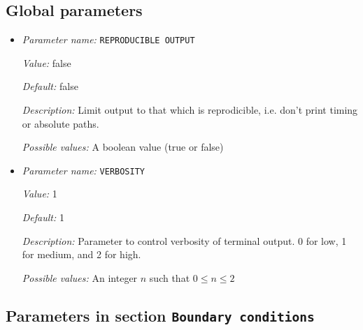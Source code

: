 \subsection{Global parameters}
\label{parameters:global}


\begin{itemize}
\item {\it Parameter name:} {\tt REPRODUCIBLE OUTPUT}
\label{parameters:REPRODUCIBLE OUTPUT}
\label{parameters:REPRODUCIBLE_20OUTPUT}


{\it Value:} false


{\it Default:} false


{\it Description:} Limit output to that which is reprodicible, i.e. don't print timing or absolute paths.


{\it Possible values:} A boolean value (true or false)
\item {\it Parameter name:} {\tt VERBOSITY}
\label{parameters:VERBOSITY}


{\it Value:} 1


{\it Default:} 1


{\it Description:} Parameter to control verbosity of terminal output. 0 for low, 1 for medium, and 2 for high.


{\it Possible values:} An integer $n$ such that $0\leq n \leq 2$
\end{itemize}



\subsection{Parameters in section \tt Boundary conditions}
\label{parameters:Boundary_20conditions}


